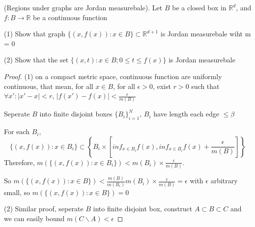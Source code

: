\begin{exercise}
(Regions under graphs are Jordan measurebale).
Let \(B\) be a closed box in \(\mathbb R^d\), and \(f:B \to \mathbb R\) be a continuous function

(1) Show that graph \(\{(x, f(x)):x \in B\} \subset \mathbb R^{d+1}\) is Jordan measurebale wiht m = 0

(2) Show that the set \(\{(x,t):x \in B; 0 \leq t \leq f(x)\}\) is Jordan measurebale

\end{exercise}

\begin{proof}
(1) on a compact metric space, continuous function are uniformly continuous, that mean, for all \(x \in B\), for all \(\epsilon > 0\),
exist \(r > 0\) such that \(\forall x': |x'-x| < r\), \(|f(x') - f(x)| < \frac{\epsilon}{m(B)}\)

Seperate \(B\) into finite disjoint boxes \(\{B_i\}_{i=1}^N\), \(B_i\) have length each edge \(\leq \beta\)

For each \(B_i\), 
\[
\{(x, f(x)):x \in B_i\} \subset \left\{B_i \times \left[ inf_{x \in B_i}f(x), inf_{x \in B_i}f(x) + \frac{\epsilon}{m(B)} \right] \right\}%
\]
Therefore, \(m(\{(x, f(x)):x \in B_i\}) < m(B_i)\times \frac{\epsilon}{m(B)}\). 

So \(m(\{(x, f(x)):x \in B\}) < \frac{m(B)}{m(B_i)} m(B_i)\times \frac{\epsilon}{m(B)} = \epsilon\) with \(\epsilon\) arbitrary small, so \(m(\{(x, f(x)):x \in B\}) = 0\)


(2) Similar proof, seperate \(B\) into finite disjoint box, construct \(A \subset B \subset C\) and we can easily bound \(m(C \backslash A) < \epsilon\)
\end{proof}